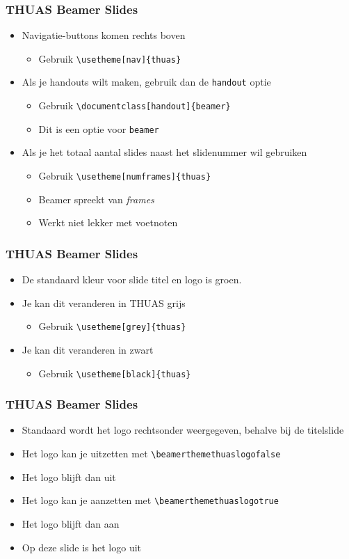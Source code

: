 \documentclass[fleqn,aspectratio=169,dutch,10pt]{beamer}
\begin{document}
\begin{frame}[fragile]
\frametitle{THUAS Beamer Slides}
\begin{itemize}
\item Navigatie-buttons komen rechts boven
\begin{itemize}
\item Gebruik \lstinline|\usetheme[nav]{thuas}|
\end{itemize}
\item Als je handouts wilt maken, gebruik dan de \lstinline|handout| optie
\begin{itemize}
\item Gebruik \lstinline|\documentclass[handout]{beamer}|
\item Dit is een optie voor \lstinline|beamer|
\end{itemize}
\item Als je het totaal aantal slides naast het slidenummer wil gebruiken
\begin{itemize}
\item Gebruik \lstinline|\usetheme[numframes]{thuas}|
\item Beamer spreekt van \textsl{frames}
\item Werkt niet lekker met voetnoten
\end{itemize}
\end{itemize}
\end{frame}


\begin{frame}[fragile]
\frametitle{THUAS Beamer Slides}
\begin{itemize}
\item De standaard kleur voor slide titel en logo is groen.
\item Je kan dit veranderen in THUAS grijs
\begin{itemize}
\item Gebruik \lstinline|\usetheme[grey]{thuas}|
\end{itemize}
\item Je kan dit veranderen in zwart
\begin{itemize}
\item Gebruik \lstinline|\usetheme[black]{thuas}|
\end{itemize}
\end{itemize}
\end{frame}


\beamerthemethuaslogofalse

\begin{frame}[fragile]
\frametitle{THUAS Beamer Slides}
\begin{itemize}
\item Standaard wordt het logo rechtsonder weergegeven, behalve bij de titelslide
\item Het logo kan je uitzetten met \lstinline|\beamerthemethuaslogofalse|
\item Het logo blijft dan uit
\item Het logo kan je aanzetten met \lstinline|\beamerthemethuaslogotrue|
\item Het logo blijft dan aan
\item Op deze slide is het logo uit
\end{itemize}
\end{frame}
\end{document}
